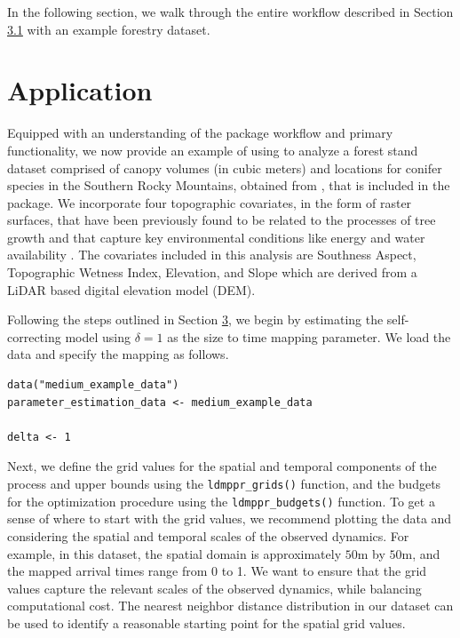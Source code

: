 In the following section, we walk through the entire workflow described
in Section \hyperref[workflow]{3.1} with an example forestry dataset.

\section{Application}\label{sec:application}

Equipped with an understanding of the package workflow and primary
functionality, we now provide an example of using  to
analyze a forest stand dataset comprised of canopy volumes (in cubic
meters) and locations for conifer species in the Southern Rocky
Mountains, obtained from \citet{drewDataBayesianRecord2024}, that is included
in the package. We incorporate four topographic covariates, in the form
of raster surfaces, that have been previously found to be related to the
processes of tree growth and that capture key environmental conditions
like energy and water availability \citep{drewBayesianRecordLinkage2025}. The
covariates included in this analysis are Southness Aspect, Topographic
Wetness Index, Elevation, and Slope which are derived from a LiDAR based
digital elevation model (DEM).

Following the steps outlined in Section \hyperref[sec:package]{3}, we begin by
estimating the self-correcting model using \(\delta=1\) as the size to
time mapping parameter. We load the data and specify the mapping as follows.

\begin{verbatim}
data("medium_example_data")
parameter_estimation_data <- medium_example_data 

delta <- 1
\end{verbatim}

{Next, we define the grid values for the spatial and temporal components
of the process and upper bounds using the \texttt{ldmppr\_grids()} function, and the budgets for the optimization procedure using the \texttt{ldmppr\_budgets()} function. To get a sense of where to start with the grid values, we recommend plotting the data and considering the spatial and temporal scales of the observed dynamics. For example, in this dataset, the spatial domain is approximately \(50\)m by \(50\)m, and the mapped arrival times range from 0 to 1. We want to ensure that the grid values capture the relevant scales of the observed dynamics, while balancing computational cost. The nearest neighbor distance distribution in our dataset can be used to identify a reasonable starting point for the spatial grid values.}

